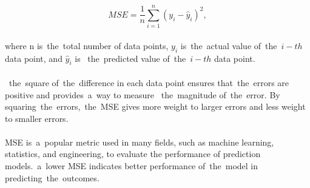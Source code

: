     \begin{equation}
    MSE = \frac{1}{n}\sum_{i=1}^{n}(y_i - \hat{y}_i)^2,
    \end{equation}
    \\
    where n is~the~total number of data points, $y_i$ is~the~actual value of~the~$i-th$ data point, and $\hat{y}_i$ is
   ~the~predicted value of~the~$i-th$ data point.\\
    \\
   ~the~square of~the~difference in each data point ensures that~the~errors are positive and provides~a~way to measure
   ~the~magnitude of~the~error. By squaring~the~errors,~the~MSE gives more weight to larger errors and less weight to
    smaller errors.\\
    \\
    MSE is~a~popular metric used in many fields, such as machine learning, statistics, and engineering, to evaluate the
    performance of prediction models.~a~lower MSE indicates better performance of~the~model in predicting~the~outcomes.
